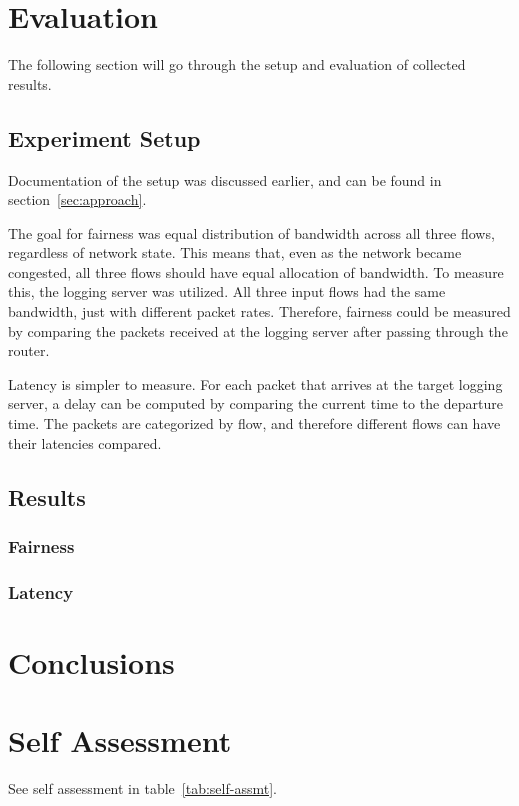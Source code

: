 \documentclass[conference]{IEEEtran}
\begin{document}
    \section{Evaluation}
The following section will go through the setup and evaluation of collected results.

    \subsection{Experiment Setup}
Documentation of the setup was discussed earlier, and can be found in section~\ref{sec:approach}.

The goal for fairness was equal distribution of bandwidth across all three flows, regardless of network state.
This means that, even as the network became congested, all three flows should have equal allocation of bandwidth.
To measure this, the logging server was utilized.
All three input flows had the same bandwidth, just with different packet rates.
Therefore, fairness could be measured by comparing the packets received at the logging server after passing through the router.

Latency is simpler to measure.
For each packet that arrives at the target logging server, a delay can be computed by comparing the current time to the departure
time.
The packets are categorized by flow, and therefore different flows can have their latencies compared.

    \subsection{Results}

    \subsubsection{Fairness}

    \subsubsection{Latency}

    \section{Conclusions}

    \section{Self Assessment}
    See self assessment in table~\ref{tab:self-assmt}.
\end{document}
